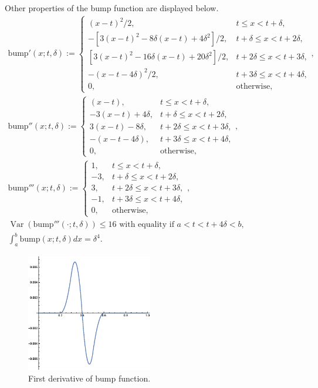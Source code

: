 \documentclass{iitthesis}
\DeclareMathOperator{\Var}{Var}
\theoremstyle{definition}
\theoremstyle{remark}
\begin{document}
Other properties of the bump function are displayed below.
\begin{subequations}
\begin{gather}
\text{bump}'(x;t,\delta):= \begin{cases} \displaystyle (x-t)^{2}/2, & t \le x < t+\delta,\\[1ex]
\displaystyle -[3(x-t)^{2}-8\delta(x-t)+4\delta^2]/2, & t+\delta \le x < t+2\delta,\\[1ex]
\displaystyle [3(x-t)^{2}-16\delta(x-t)+20\delta^2]/2, & t+2\delta \le x < t+3\delta,\\[1ex]
\displaystyle -(x-t-4\delta)^2/2, & t+3\delta \le x < t+4\delta,\\[1ex]
\displaystyle  0, & \text{otherwise},
\end{cases}, \\
\text{bump}''(x;t,\delta):= \begin{cases} \displaystyle (x-t), & t \le x < t+\delta,\\[1ex]
\displaystyle -3(x-t)+4\delta, & t+\delta \le x < t+2\delta,\\[1ex]
\displaystyle 3(x-t)-8\delta, & t+2\delta \le x < t+3\delta,\\[1ex]
\displaystyle -(x-t-4\delta), & t+3\delta \le x < t+4\delta,\\[1ex]
\displaystyle  0, & \text{otherwise},
\end{cases}, \\
\text{bump}'''(x;t,\delta):= \begin{cases} \displaystyle 1, & t \le x < t+\delta,\\[1ex]
\displaystyle -3, & t+\delta \le x < t+2\delta,\\[1ex]
\displaystyle 3, & t+2\delta \le x < t+3\delta,\\[1ex]
\displaystyle -1, & t+3\delta \le x < t+4\delta,\\[1ex]
\displaystyle  0, & \text{otherwise},
\end{cases}, \\
\Var(\text{bump}'''(\cdot;t,\delta))\le 16 \text{ with equality if } a<t<t+4\delta<b, \\
\int_{a}^{b}\text{bump}(x;t,\delta)dx=\delta^4.
\end{gather}
\end{subequations}
\begin{figure}[h]
\centering
\includegraphics[width=5.5cm]{bumpp1.eps}
\caption{First derivative of bump function. \label{fig:bumpp1}}
\end{figure}
\end{document}
